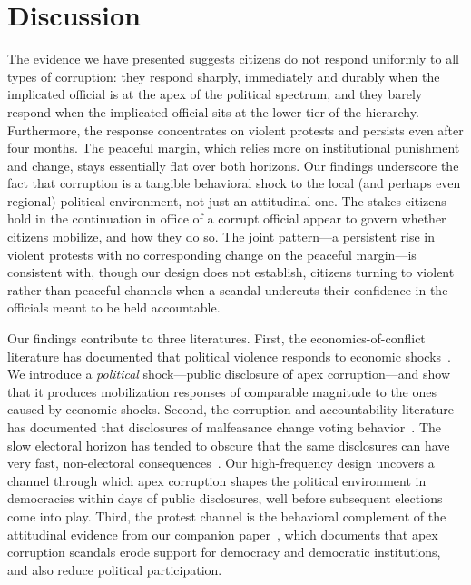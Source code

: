 \documentclass[11pt]{article}
\begin{document}
\section{Discussion}
The evidence we have presented suggests citizens do not respond uniformly to all types of corruption: they respond sharply, immediately and durably when the implicated official is at the apex of the political spectrum, and they barely respond when the implicated official sits at the lower tier of the hierarchy. Furthermore, the response concentrates on violent protests and persists even after four months. The peaceful margin, which relies more on institutional punishment and change, stays essentially flat over both horizons. Our findings underscore the fact that corruption is a tangible behavioral shock to the local (and perhaps even regional) political environment, not just an attitudinal one. The stakes citizens hold in the continuation in office of a corrupt official appear to govern whether citizens mobilize, and how they do so. The joint pattern---a persistent rise in violent protests with no corresponding change on the peaceful margin---is consistent with, though our design does not establish, citizens turning to violent rather than peaceful channels when a scandal undercuts their confidence in the officials meant to be held accountable.

Our findings contribute to three literatures. First, the economics-of-conflict literature has documented that political violence responds to economic shocks~\citep{koenig2017networks,mcguirk2020economic,dube2013commodity,besley2011logic,berman2011hearts,rohner2026aidingpeace}. We introduce a \textit{political} shock---public disclosure of apex corruption---and show that it produces mobilization responses of comparable magnitude to the ones caused by economic shocks. Second, the corruption and accountability literature has documented that disclosures of malfeasance change voting behavior~\citep{ferraz2008exposing,ferraz2011electoral,FerrazFinanAccount,ferraz2018audits,horacio2019infonetwork}. The slow electoral horizon has tended to obscure that the same disclosures can have very fast, non-electoral consequences~\citep{madestam2013protests,bursztyn2021persistent}. Our high-frequency design uncovers a channel through which apex corruption shapes the political environment in democracies within days of public disclosures, well before subsequent elections come into play. Third, the protest channel is the behavioral complement of the attitudinal evidence from our companion paper~\citep{ApexCorruption}, which documents that apex corruption scandals erode support for democracy and democratic institutions, and also reduce political participation.
\end{document}
